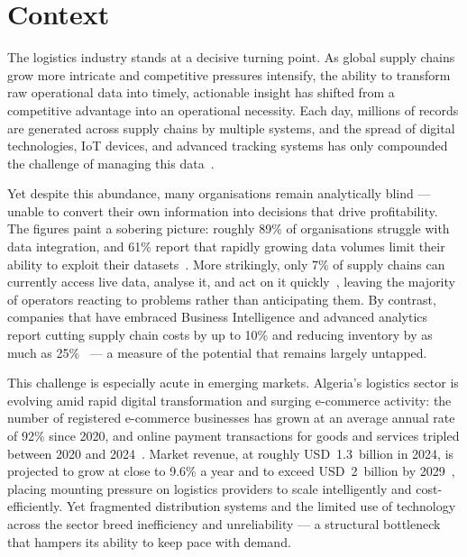 
\section*{Context}

The logistics industry stands at a decisive turning point. As global supply chains grow more
intricate and competitive pressures intensify, the ability to transform raw operational data
into timely, actionable insight has shifted from a competitive advantage into an operational
necessity. Each day, millions of records are generated across supply chains by multiple
systems, and the spread of digital technologies, IoT devices, and advanced tracking systems has
only compounded the challenge of managing this data~\parencite{kpmg2024}.

Yet despite this abundance, many organisations remain analytically blind --- unable to convert
their own information into decisions that drive profitability. The figures paint a sobering
picture: roughly 89\% of organisations struggle with data integration, and 61\% report that
rapidly growing data volumes limit their ability to exploit their datasets~\parencite{enveyo2025}.
More strikingly, only 7\% of supply chains can currently access live data, analyse it, and act
on it quickly~\parencite{enveyo2025}, leaving the majority of operators reacting to problems rather
than anticipating them. By contrast, companies that have embraced Business Intelligence and
advanced analytics report cutting supply chain costs by up to 10\% and reducing inventory by as
much as 25\%~\parencite{intelligentaudit2024} --- a measure of the potential that remains largely
untapped.

This challenge is especially acute in emerging markets. Algeria's logistics sector is evolving
amid rapid digital transformation and surging e-commerce activity: the number of registered
e-commerce businesses has grown at an average annual rate of 92\% since 2020, and online payment
transactions for goods and services tripled between 2020 and 2024~\parencite{unctad2025}. Market
revenue, at roughly USD~1.3~billion in 2024, is projected to grow at close to 9.6\% a year and to
exceed USD~2~billion by 2029~\parencite{statista2025}, placing mounting pressure on logistics
providers to scale intelligently and cost-efficiently. Yet fragmented distribution systems and
the limited use of technology across the sector breed inefficiency and unreliability --- a
structural bottleneck that hampers its ability to keep pace with demand.

